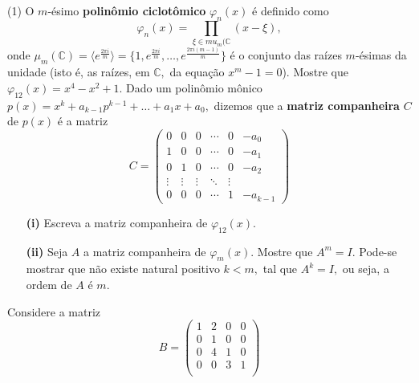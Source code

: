\documentclass[12pt, a4paper]{article}
\newcommand{\negrito}[1]{\mbox{\boldmath{$#1$}}}
\begin{document}
\begin{tasks}[counter-format={(tsk[a])},label-width=3.6ex, label-format = {\bfseries}, column-sep = {0pt}](1)
\task[\textcolor{Floresta}{$\negrito{(a)} $}] O $m$-ésimo \textbf{polinômio ciclotômico} $\varphi_n(x)$ é definido como 
\[
\varphi_n(x) = \prod\limits_{\xi \in mu_m(\mathbb{C}} (x - \xi),
\]
onde $\mu_m(\mathbb{C}) = \langle e^{\frac{2 \pi i}{m}} \rangle = \{1, e^{\frac{2 \pi i}{m}}, \ldots, e^{\frac{2 \pi i (m-1)}{m}} \}$ é o conjunto das raízes $m$-ésimas da unidade (isto é, as raízes, em $\mathbb{C},$ da equação $x^m - 1 = 0$). Mostre que $\varphi_{12}(x) = x^{4} - x^2 + 1.$
\task[\textcolor{Floresta}{$\negrito{(b)} $}] Dado um polinômio mônico $p(x) = x^k + a_{k-1}p^{k-1} + \ldots + a_1x + a_0,$ dizemos que a \textbf{matriz companheira} $C$ de $p(x)$ é a matriz
\[
C = \left(\begin{array}{cccccc}
0 & 0 & 0 & \cdots & 0 &-a_0 \\
1 & 0 & 0 & \cdots & 0 &-a_1 \\
0 & 1 & 0 & \cdots & 0 &-a_2 \\
\vdots & \vdots & \vdots & \ddots & \vdots \\
0 & 0 & 0 & \cdots & 1 &-a_{k-1} 
\end{array}\right)
\]
\begin{itemize}
\item[\textbf{(i)}] Escreva a matriz companheira de $\varphi_{12}(x).$
\item[\textbf{(ii)}] Seja $A$ a matriz companheira de $\varphi_m(x).$ Mostre que $A^m = I.$ Pode-se mostrar que não existe natural positivo $k < m,$ tal que $A^k = I,$ ou seja, a ordem de $A$ é $m.$
\end{itemize}
\task[\textcolor{Floresta}{$\negrito{(c)} $}] Considere a matriz
\[
B = \left(\begin{array}{cccc}
1 & 2 & 0 & 0\\
0 & 1 & 0 & 0\\
0 & 4 & 1 & 0\\
0 & 0 & 3 & 1\\
\end{array}\right)
\]


\end{tasks}
\end{document}
